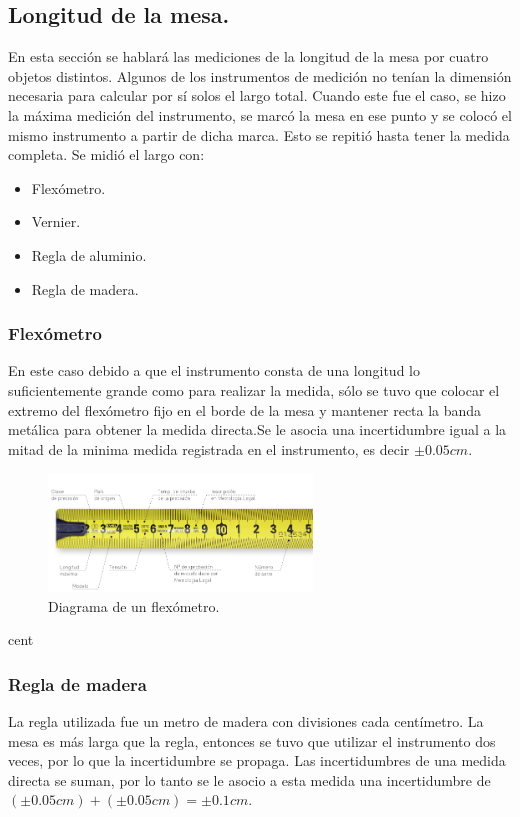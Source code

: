 \documentclass{article}
\begin{document}
\subsection{Longitud de la mesa.}
En esta sección se hablará las mediciones de la longitud de la mesa por cuatro objetos distintos. Algunos de los instrumentos de medición no tenían la dimensión necesaria para calcular por sí solos el largo total. Cuando este fue el caso, se hizo la máxima medición del instrumento, se marcó la mesa en ese punto y se colocó el mismo instrumento a partir de dicha marca. Esto se repitió hasta tener la medida completa. Se midió el largo con:
\begin{itemize}
  \item Flexómetro.
  \item Vernier.
  \item Regla de aluminio.
  \item Regla de madera.
\end{itemize}

\subsubsection{Flexómetro}
En este caso debido a que el instrumento consta de una longitud lo suficientemente grande como para realizar la medida, sólo se tuvo que colocar el extremo del flexómetro fijo en el borde de la mesa y mantener recta la banda metálica para obtener la medida directa.Se le asocia una incertidumbre igual a la mitad de la minima medida registrada en el instrumento, es decir $\pm0.05cm.$

\begin{figure}[H]
    \centering
    \includegraphics[width=7cm]{cert.png}%
    \caption{Diagrama de un flexómetro.}%
\end{figure}
cent
\subsubsection{Regla de madera}
La regla utilizada fue un metro de madera con divisiones cada centímetro. La mesa es más larga que la regla, entonces se tuvo que utilizar el instrumento dos veces, por lo que la incertidumbre se propaga. Las incertidumbres de una medida directa se suman, por lo tanto se le asocio a esta medida una incertidumbre de $(\pm0.05cm) + (\pm 0.05cm) = \pm 0.1 cm.$
\end{document}
